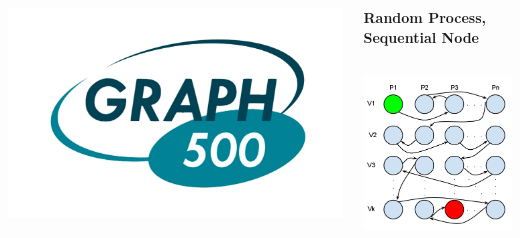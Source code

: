 \documentclass[final]{beamer}
\begin{document}
\begin{frame}[t]
\begin{columns}[t]
\begin{column}{0.60\paperwidth}
\begin{columns}[t,totalwidth=0.60\paperwidth]
\begin{column}{0.28\paperwidth}
\begin{columns}[t,totalwidth=0.28\paperwidth]
\begin{column}{0.12\paperwidth}
								\begin{center} \includegraphics[width=0.12\paperwidth]{img/logo_graph500} \end{center}
							\end{column}
						\end{columns}
					\end{column}
					\begin{column}{0.28\paperwidth}
						\begin{center} \bf{Random Process, Sequential Node} \end{center}
						\begin{columns}[t,totalwidth=0.28\paperwidth]
							\begin{column}{0.12\paperwidth}
								\begin{center} \includegraphics[width=0.12\paperwidth]{img/linked_list/rand_proc_seq_node} \end{center}

\end{column}
\end{columns}
\end{column}
\end{columns}
\end{column}
\end{columns}
\end{frame}
\end{document}
